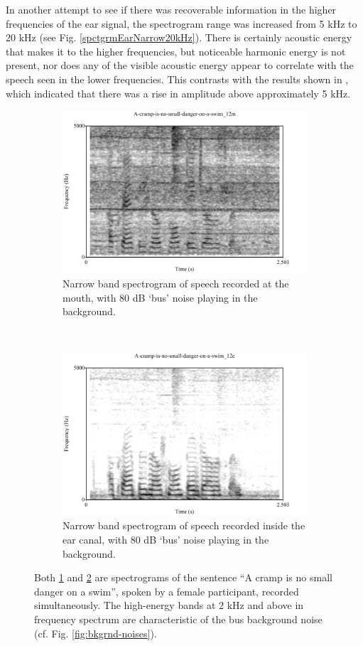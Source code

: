 In another attempt to see if there was recoverable information in the higher frequencies of the ear signal, the spectrogram range was increased from 5 kHz to 20 kHz (see Fig. \ref{spctgrmEarNarrow20kHz}). There is certainly acoustic energy that makes it to the higher frequencies, but noticeable harmonic energy is not present, nor does any of the visible acoustic energy appear to correlate with the speech seen in the lower frequencies.  This contrasts with the results shown in \cite{hansen:97b}, which indicated that there was a rise in amplitude above approximately 5 kHz.

\begin{figure}[H]
\centering
\begin{subfigure}{\textwidth}
  \centering
  \includegraphics[width=0.75\linewidth]{figure/spctgrmNarrowMthNoise_35.pdf}
  \caption{Narrow band spectrogram of speech recorded at the mouth, with 80 dB `bus' noise playing in the background.}
  \label{spctgrmNarrowMouthNoise_35}
\end{subfigure}%
\\[2ex]
\begin{subfigure}{\textwidth}
  \centering
  \includegraphics[width=0.75\linewidth]{figure/spctgrmNarrowEarNoise_35.pdf}
  \caption{Narrow band spectrogram of speech recorded inside the ear canal, with 80 dB `bus' noise playing in the background.}
  \label{spctgrmNarrowEarNoise_35}
\end{subfigure}
\caption{Both \ref{spctgrmNarrowMouthNoise_35} and \ref{spctgrmNarrowEarNoise_35} are spectrograms of the sentence ``A cramp is no small danger on a swim'', spoken by a female participant, recorded simultaneously.  The high-energy bands at 2 kHz and above in frequency spectrum are characteristic of the bus background noise (cf. Fig. \ref{fig:bkgrnd-noises}).}
\label{fig:noise_mth_ear}
\end{figure}

